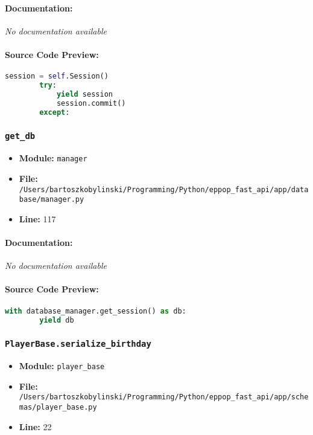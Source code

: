\documentclass[11pt,a4paper]{article}
\begin{document}
\paragraph{Documentation:} \textit{No documentation available}

\paragraph{Source Code Preview:}
\begin{lstlisting}[language=Python]
        session = self.Session()
        try:
            yield session
            session.commit()
        except:
\end{lstlisting}

\vspace{1em}
\subsubsection{\texttt{get\_db}}

\begin{itemize}
    \item \textbf{Module:} \texttt{manager}
    \item \textbf{File:} \texttt{/Users/bartoszkobylinski/Programming/Python/eppop\_fast\_api/app/database/manager.py}
    \item \textbf{Line:} 117
\end{itemize}

\paragraph{Documentation:} \textit{No documentation available}

\paragraph{Source Code Preview:}
\begin{lstlisting}[language=Python]
    with database_manager.get_session() as db:
        yield db
\end{lstlisting}

\vspace{1em}
\subsubsection{\texttt{PlayerBase.serialize\_birthday}}

\begin{itemize}
    \item \textbf{Module:} \texttt{player\_base}
    \item \textbf{File:} \texttt{/Users/bartoszkobylinski/Programming/Python/eppop\_fast\_api/app/schemas/player\_base.py}
    \item \textbf{Line:} 22
\end{itemize}
\end{document}
